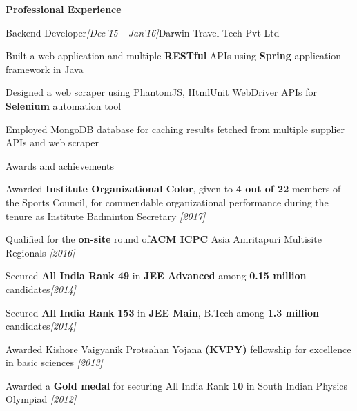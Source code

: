 \documentclass[a4paper,10pt]{resume}%
\begin{document}
\begin{rSection}{{\textbf{Professional Experience}}}
\begin{rSubsection}{{Backend Developer}}{\sl \small[Dec'15 - Jan'16]}{Darwin Travel Tech Pvt Ltd}
\vspace{-1.0mm}
\item Built a web application and multiple \textbf{RESTful} APIs using \textbf{Spring} application framework in Java
\item Designed a web scraper using PhantomJS, HtmlUnit WebDriver APIs for \textbf{Selenium} automation tool
\item Employed MongoDB database for caching results fetched from multiple supplier APIs and web scraper
\end{rSubsection}
\end{rSection}
\vspace{-2.0mm}

\begin{rSection}{{Awards and achievements}}
\begin{eSubsection}{}{}{}{}
\vspace{-4mm}
\item Awarded \textbf{Institute Organizational Color}, given to \textbf{4 out of 22} members of the Sports Council, for commendable organizational performance during the tenure as Institute Badminton Secretary  \hfill{\sl \small [2017]}
\item Qualified for the \textbf{on-site} round of\textbf{ACM ICPC} Asia Amritapuri Multisite Regionals \hfill{\sl \small [2016]}
\item Secured \textbf{All India Rank 49} in \textbf{JEE Advanced} among \textbf{0.15 million} candidates\hfill{\sl \small [2014]}
\item Secured \textbf{All India Rank} \textbf{153} in \textbf{JEE Main}, B.Tech among \textbf{1.3 million} candidates\hfill{\sl \small [2014]}
\item Awarded Kishore Vaigyanik Protsahan Yojana \textbf{(KVPY)} fellowship for excellence in basic sciences \hfill{\sl \small [2013]} 
\item Awarded a \textbf{Gold medal} for securing All India Rank \textbf{10} in South Indian Physics Olympiad \hfill{\sl \small [2012]}
\end{eSubsection}
\end{rSection}
\vspace{-2.0mm}
\end{document}
